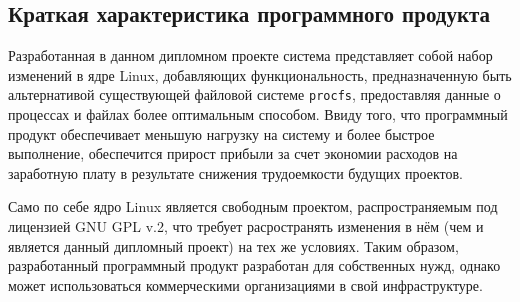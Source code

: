 









\FPround{}


\subsection{Краткая характеристика программного продукта}

Разработанная в данном дипломном проекте система представляет собой набор
изменений в ядре Linux, добавляющих функциональность, предназначенную быть
альтернативой существующей файловой системе \texttt{procfs}, предоставляя данные
о процессах и файлах более оптимальным способом. Ввиду того, что программный
продукт обеспечивает меньшую нагрузку на систему и более быстрое выполнение,
обеспечится прирост прибыли за счет экономии расходов на заработную плату в
результате снижения трудоемкости будущих проектов.

Само по себе ядро Linux является свободным проектом, распространяемым под
лицензией GNU GPL v.2, что требует расространять изменения в нём (чем и является
данный дипломный проект) на тех же условиях. Таким образом, разработанный
программный продукт разработан для собственных нужд, однако может использоваться
коммерческими организациями в свой инфраструктуре.


